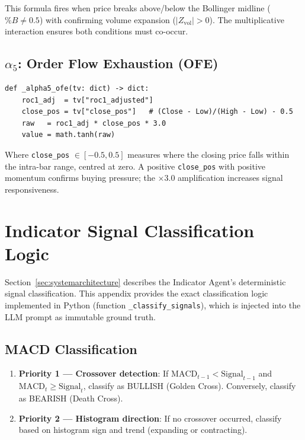 This formula fires when price breaks above/below the Bollinger midline ($\%B \ne 0.5$) with confirming volume expansion ($|Z_{\mathrm{vol}}| > 0$). The multiplicative interaction ensures both conditions must co-occur.

\subsection{$\alpha_5$: Order Flow Exhaustion (OFE)}

\begin{small}
\begin{verbatim}
def _alpha5_ofe(tv: dict) -> dict:
    roc1_adj  = tv["roc1_adjusted"]
    close_pos = tv["close_pos"]   # (Close - Low)/(High - Low) - 0.5
    raw   = roc1_adj * close_pos * 3.0
    value = math.tanh(raw)
\end{verbatim}
\end{small}

Where \texttt{close\_pos} $\in [-0.5, 0.5]$ measures where the closing price falls within the intra-bar range, centred at zero. A positive \texttt{close\_pos} with positive momentum confirms buying pressure; the $\times 3.0$ amplification increases signal responsiveness.


\section{Indicator Signal Classification Logic}
\label{app:indicator_classify}

Section~\ref{sec:systemarchitecture} describes the Indicator Agent's deterministic signal classification. This appendix provides the exact classification logic implemented in Python (function \texttt{\_classify\_signals}), which is injected into the LLM prompt as immutable ground truth.

\subsection{MACD Classification}

\begin{enumerate}
\item \textbf{Priority 1 --- Crossover detection}: If $\mathrm{MACD}_{t-1} < \mathrm{Signal}_{t-1}$ and $\mathrm{MACD}_t \geq \mathrm{Signal}_t$, classify as BULLISH (Golden Cross). Conversely, classify as BEARISH (Death Cross).
\item \textbf{Priority 2 --- Histogram direction}: If no crossover occurred, classify based on histogram sign and trend (expanding or contracting).
\end{enumerate}

